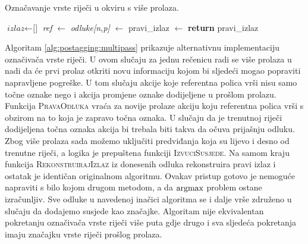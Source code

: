 \begin{algorithm}
\caption{Označavanje vrste riječi u \lts{} okviru s više prolaza.}\label{alg:postagging:multipass}
\begin{algorithmic}[1]
\State $\textit{izlaz} \gets \text{[]}$
    \State \textit{ref} $\gets$ 
    \State \textit{odluke[n,p]} $\gets$ 
  \EndFor
\EndFor
\State pravi\_izlaz $\gets$ 
\State {}
\State \textbf{return} pravi\_izlaz
\EndFunction
\end{algorithmic}
\end{algorithm}

Algoritam \ref{alg:postagging:multipass} prikazuje alternativnu implementaciju
označivača vrste riječi. U ovom slučaju za jednu rečenicu radi se više prolaza u
nadi da će prvi prolaz otkriti novu informaciju kojom bi sljedeći mogao
popraviti napravljene pogreške. U tom slučaju akcije koje referentna polica vrši
nisu samo točne oznake nego i akcija promjene oznake dodijeljene u prošlom
prolazu. Funkcija \textsc{PravaOdluka} vraća za novije prolaze akciju koju
referentna polica vrši s obzirom na to koja je zapravo točna oznaka. U slučaju
da je trenutnoj riječi dodijeljena točna oznaka akcija bi trebala biti takva da
očuva prijašnju odluku. Zbog više prolaza sada možemo uključiti predviđanja koja
su lijevo i desno od trenutne riječi, a logika je prepuštena funkciji
\textsc{IzvuciSusjede}. Na samom kraju funkcija \textsc{RekonstruirajIzlaz} iz
donesenih odluka rekonstruira pravi izlaz i ostatak je identičan originalnom
algoritmu. Ovakav pristup gotovo je nemoguće napraviti s bilo kojom drugom
metodom, a da $\operatorname*{argmax}$ problem ostane izračunljiv. Sve odluke u navedenoj
inačici algoritma se i dalje vrše združeno u slučaju da dodajemo susjede kao
značajke. Algoritam nije ekvivalentan pokretanju označivača vrste riječi više
puta gdje drugo i sva sljedeća pokretanja imaju značajku vrste riječi prošlog
prolaza.
